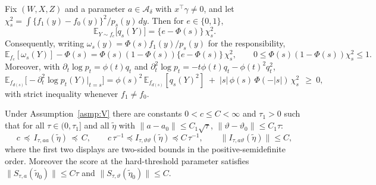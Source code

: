 \documentclass[10pt,a4paper]{amsart}
\newcommand{\E}{\mathbb{E}}
\begin{document}
\begin{lemma}
\label{lem:conditional_score_gate_mismatch_new}
Fix $(W,X,Z)$ and a parameter $a\in\mathcal A_\delta$ with $x^\top\gamma\ne0$, and let
$\chi^2_s=\int\{f_1(y)-f_0(y)\}^2/p_s(y)\,dy$. Then for $e\in\{0,1\}$,
\begin{equation}
\E_{Y\sim f_e}\big[q_s(Y)\big]=\{e-\Phi(s)\}\,\chi^2_s .
\label{eq:chisq_identity_app}
\end{equation}
Consequently, writing $\omega_s(y)=\Phi(s)f_1(y)/p_s(y)$ for the responsibility,
\[
\E_{f_e}[\omega_s(Y)]-\Phi(s)=\Phi(s)(1-\Phi(s))\{e-\Phi(s)\}\,\chi^2_s ,
\qquad
0\le\Phi(s)(1-\Phi(s))\chi^2_s\le1 .
\]
Moreover, with $\partial_t\log p_t=\phi(t)q_t$ and $\partial^2_t\log p_t=-t\phi(t)q_t-\phi(t)^2q_t^2$,
\begin{equation}
\E_{f_{d(s)}}\big[-\partial^2_t\log p_t(Y)\big|_{t=s}\big]
=\phi(s)^2\,\E_{f_{d(s)}}[q_s(Y)^2]\;+\;|s|\,\phi(s)\,\Phi(-|s|)\,\chi^2_s\ \ \ge\ 0 ,
\label{eq:pointwise_info_positivity}
\end{equation}
with strict inequality whenever $f_1\neq f_0$.
\end{lemma}

\begin{lemma}
\label{lem:aniso_information}
Under Assumption~\ref{asmp:V} there are constants $0<c\le C<\infty$ and $\tau_1>0$ such that for all $\tau\in(0,\tau_1]$ and all $\tilde\eta$ with $\|a-a_0\|\le C_1\sqrt\tau$, $\|\vartheta-\vartheta_0\|\le C_1\tau$:
\[
c\,\preceq\, I_{\tau,aa}(\tilde\eta)\,\preceq\, C,\qquad
c\,\tau^{-1}\preceq I_{\tau,\vartheta\vartheta}(\tilde\eta)\preceq C\,\tau^{-1},\qquad
\|I_{\tau,a\vartheta}(\tilde\eta)\|\le C,
\]
where the first two displays are two-sided bounds in the positive-semidefinite order. Moreover the score at the hard-threshold parameter satisfies
$\|S_{\tau,a}(\tilde\eta_0)\|\le C\tau$ and $\|S_{\tau,\vartheta}(\tilde\eta_0)\|\le C$.
\end{lemma}
\end{document}
